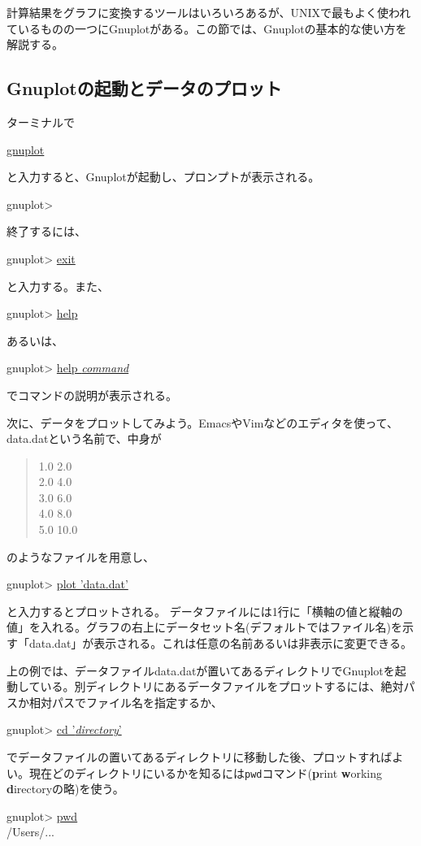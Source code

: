 計算結果をグラフに変換するツールはいろいろあるが、UNIXで最もよく使われているものの一つにGnuplotがある。この節では、Gnuplotの基本的な使い方を解説する。

\subsection{Gnuplotの起動とデータのプロット}

ターミナルで
\begin{commandline2}
    \prompt \underline{gnuplot}
\end{commandline2} \noindent
と入力すると、Gnuplotが起動し、プロンプトが表示される。
\begin{commandline2}
    gnuplot>
\end{commandline2} \noindent
終了するには、
\begin{commandline2}
    gnuplot> \underline{exit}
\end{commandline2} \noindent
と入力する。また、
\begin{commandline2}
    gnuplot> \underline{help}
\end{commandline2} \noindent
あるいは、
\begin{commandline2}
    gnuplot> \underline{help \textit{command}}
\end{commandline2} \noindent
でコマンドの説明が表示される。

次に、データをプロットしてみよう。EmacsやVimなどのエディタを使って、data.datという名前で、中身が
\begin{quote}
    1.0 2.0 \\
    2.0 4.0 \\
    3.0 6.0 \\
    4.0 8.0 \\
    5.0 10.0
\end{quote}
のようなファイルを用意し、
\begin{commandline2}
    gnuplot> \underline{plot 'data.dat'}
\end{commandline2} \noindent
と入力するとプロットされる。 データファイルには1行に「横軸の値と縦軸の値」を入れる。グラフの右上にデータセット名(デフォルトではファイル名)を示す「data.dat」が表示される。これは任意の名前あるいは非表示に変更できる。

上の例では、データファイルdata.datが置いてあるディレクトリでGnuplotを起動している。別ディレクトリにあるデータファイルをプロットするには、絶対パスか相対パスでファイル名を指定するか、
\begin{commandline2}
    gnuplot> \underline{cd '\textit{directory}'}
\end{commandline2} \noindent
でデータファイルの置いてあるディレクトリに移動した後、プロットすればよい。現在どのディレクトリにいるかを知るには\texttt{pwd}コマンド(\textbf{p}rint \textbf{w}orking \textbf{d}irectoryの略)を使う。
\begin{commandline2}
    gnuplot> \underline{pwd}\\
    /Users/...
\end{commandline2} \noindent

